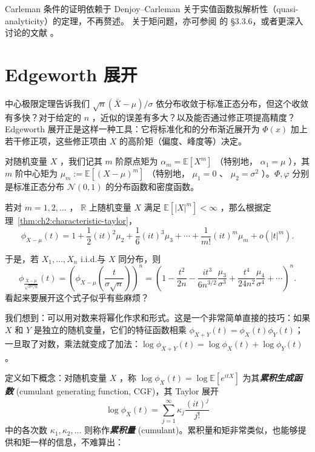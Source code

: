 Carleman 条件的证明依赖于 Denjoy--Carleman 关于实值函数拟解析性（quasi-analyticity）的定理，不再赘述。
关于矩问题，亦可参阅 \cite{durrett2010} 的 §3.3.6，或者更深入讨论的文献 \cite{schmudgen2017}。

\section{Edgeworth 展开}

中心极限定理告诉我们 $\sqrt{n}(\bar X-\mu)/\sigma$ 依分布收敛于标准正态分布，但这个收敛有多快？对于给定的 $n$ ，近似的误差有多大？以及能否通过修正项提高精度？Edgeworth 展开正是这样一种工具：它将标准化和的分布渐近展开为 $\Phi(x)$ 加上若干修正项，这些修正项由 $X$ 的高阶矩（偏度、峰度等）决定。

对随机变量 $X$ ，我们记其 $m$ 阶原点矩为 $\alpha_m=\mathbb{E}[X^m]$ （特别地， $\alpha_1=\mu$ ），其 $m$ 阶中心矩为 $\mu_m:=\mathbb{E}[(X-\mu)^m]$ （特别地， $\mu_1=0$ 、 $\mu_2=\sigma^2$ ）。$\Phi,\varphi$ 分别是标准正态分布 $\mathcal N(0,1)$ 的分布函数和密度函数。

若对 $m=1,2,\dots$ ， $\mathbb R$ 上随机变量 $X$ 满足 $\mathbb{E}[|X|^m]<\infty$ ，那么根据定理~\ref{thm:ch2:characteristic-taylor}，
\[
\phi_{X-\mu}(t) = 1 + \frac{1}{2}(it)^2\mu_2 +\frac{1}{6}(it)^3 \mu_3 +\cdots + \frac{1}{m!} (it)^m\mu_m + o(|t|^m).
\]

于是，若 $X_1,\dots,X_n$ i.i.d.与 $X$ 同分布，则\[\phi_{\frac{\bar{X}-\mu}{\sqrt{\sigma^2/n}}}(t) = \left(\phi_{X-\mu}\!\left(\frac{t}{\sigma\sqrt{n}}\right)\right)^n = \left(1 - \frac{t^2}{2n} - \frac{i t^3}{6 n^{3/2}} \frac{\mu_3}{\sigma^3} + \frac{t^4}{24 n^2} \frac{\mu_4}{\sigma^4} + \cdots\right)^n.\]
看起来要展开这个式子似乎有些麻烦？

我们想到：可以用对数来将幂化作求和形式。这是一个非常简单直接的技巧：如果 $X$ 和 $Y$ 是独立的随机变量，它们的特征函数相乘 $\phi_{X+Y}(t) = \phi_X(t)\phi_Y(t)$；一旦取了对数，乘法就变成了加法：$\log \phi_{X+Y}(t) = \log \phi_X(t) + \log \phi_Y(t)$。

定义如下概念：对随机变量 $X$ ，称 $\log \phi_X(t)=\log\mathbb{E}[e^{itX}]$ 为其\textbf{\emph{累积生成函数}} (cumulant generating function, CGF)，其 Taylor 展开 \[ \log \phi_X(t)=\sum_{j=1}^\infty \kappa_j\frac{(it)^j}{j!} \]中的各次数 $\kappa_1,\kappa_2,\dots$ 则称作\textbf{\emph{累积量}} (cumulant)。累积量和矩非常类似，也能够提供和矩一样的信息，不难算出：

